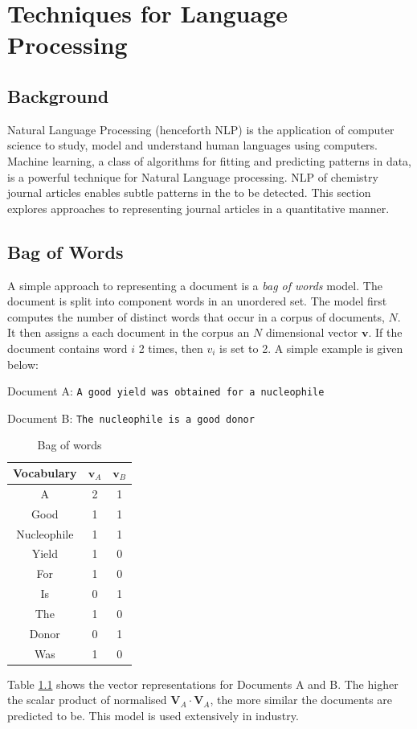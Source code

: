 \chapter{Techniques for Language Processing}
\section{Background}
Natural Language Processing (henceforth NLP) is the application of computer science to study, model and understand human languages using computers. Machine learning, a class of algorithms for fitting and predicting patterns in data, is a powerful technique for Natural Language processing. NLP of chemistry journal articles enables subtle patterns in the to be detected. This section explores approaches to representing journal articles in a quantitative manner.
\section{Bag of Words}
A simple approach to representing a document is a \emph{bag of words} model. The document is split into component words in an unordered set. The model first computes the number of distinct words that occur in a corpus of documents, $N$. It then assigns a each document in the corpus an $N$ dimensional vector $\mathbf{v}$. If the document contains word $i$ 2 times, then $v_{i}$ is set to 2. A simple example is given below:

Document A: \texttt{A good yield was obtained for a nucleophile}

Document B: \texttt{The nucleophile is a good donor}
\begin{table}[H]
\label{tab:BAGOFWORDS}
\caption{Bag of words}
\begin{center}
\begin{tabular}{||c|c|c||}
\hline
Vocabulary &  $\mathbf{v}_A$ & $\mathbf{v}_B$\\
\hline
A & 2 & 1\\
Good & 1 & 1\\
Nucleophile & 1 & 1 \\
Yield & 1 & 0\\
For & 1& 0\\
Is & 0 & 1\\
The & 1 & 0\\
Donor & 0 & 1\\
Was & 1 & 0\\
\hline
\end{tabular}
\end{center}
\end{table}
Table \ref{tab:BAGOFWORDS} shows the vector representations for Documents A and B. The higher the scalar product of normalised $\mathbf{V}_A \cdot \mathbf{V}_A$, the more similar the documents are predicted to be. This model is used extensively in industry.
